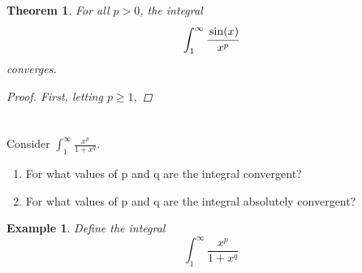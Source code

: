 \documentclass[]{article}
\newtheorem{theorem}{Theorem}
\newtheorem{example}{Example}
\begin{document}
\begin{theorem}
    For all $p>0$, the integral \[
        \int_{1}^{\infty} \cfrac{\sin(x)}{x^p}
    \] converges.
    \begin{proof}
        First, letting $p \geq 1$, 
    \end{proof}
\end{theorem}










\newpage
\section{}
Consider $\int_{1}^{\infty} \frac{x^p}{1 + x^q}$.
\begin{enumerate}
    \item For what values of p and q are the integral convergent?
    \item For what values of p and q are the integral absolutely convergent?
\end{enumerate}

\begin{example}
    Define the integral\[
        \int_{1}^{\infty} \frac{x^p}{1 + x^q}
    \]

\end{example}
\end{document}
